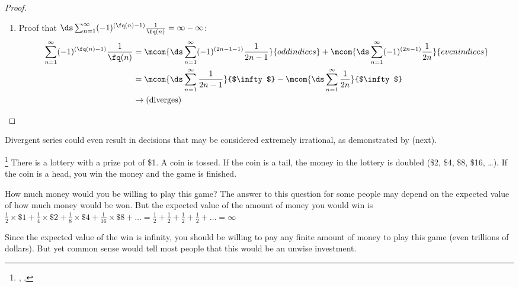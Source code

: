 \begin{proof}
\begin{enumerate}
  \item Proof that $\ds\sum_{n=1}^\infty (-1)^{(\fq(n)-1)} \frac{1}{\fq(n)}=\infty-\infty$:
    \begin{align*} 
      \sum_{n=1}^\infty (-1)^{(\fq(n)-1)} \frac{1}{\fq(n)} 
        &= \mcom{\ds\sum_{n=1}^\infty (-1)^{(2n-1-1)} \frac{1}{2n-1}}{odd indices} 
         + \mcom{\ds\sum_{n=1}^\infty (-1)^{(2n-1)} \frac{1}{2n}}{even indices}
      \\&= \mcom{\ds\sum_{n=1}^\infty \frac{1}{2n-1}}{$\infty$} - \mcom{\ds\sum_{n=1}^\infty \frac{1}{2n}}{$\infty$}
      \\&\rightarrow \text{(diverges)}
    \end{align*}
\end{enumerate}
\end{proof}

Divergent series could even result in decisions that may be considered extremely irrational, as demonstrated
by  (next).
\begin{example}
\footnote{
  , %
  ,
  }
There is a lottery with a prize pot of \$1.
A coin is tossed.
If the coin is a tail, the money in the lottery is doubled (\$2, \$4, \$8, \$16, \ldots).
If the coin is a head, you win the money and the game is finished.

How much money would you be willing to play this game?
The answer to this question for some people may depend on the expected value of how much money would be won.
But the expected value of the amount of money you would win is
\\\indentx$ 
  \frac{1}{2}  \times \$1 + 
  \frac{1}{4}  \times \$2 + 
  \frac{1}{8}  \times \$4 + 
  \frac{1}{16} \times \$8 + \ldots 
  = 
  \frac{1}{2} + 
  \frac{1}{2} + 
  \frac{1}{2} + 
  \frac{1}{2} + \ldots
  = \infty
  $

Since the expected value of the win is infinity, you should be willing to pay any finite amount of money to play this game
(even trillions of dollars).
But yet common sense would tell most people that this would be an unwise investment.
\end{example}



